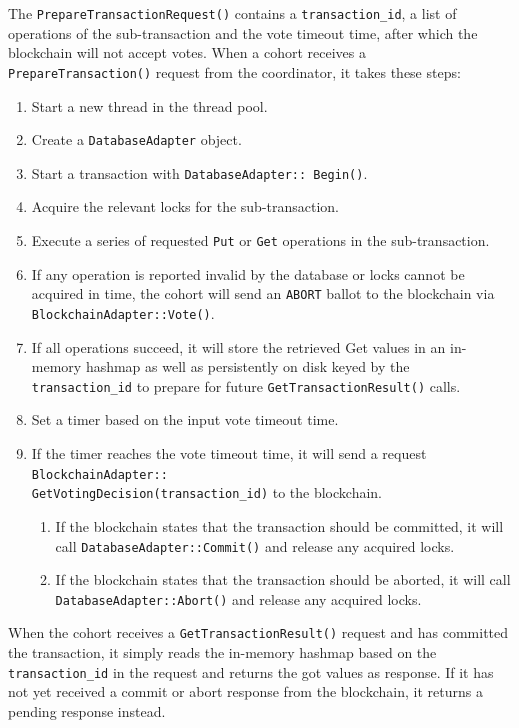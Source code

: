 \documentclass[11pt,conference]{IEEEtran}
\begin{document}
The \texttt{PrepareTransactionRequest()} contains a \texttt{transaction\_id}, a list of operations of the sub-transaction and the vote timeout time, after which the blockchain will not accept votes. When a cohort receives a \texttt{PrepareTransaction()} request from the coordinator, it takes these steps: 
\begin{enumerate}
  \item Start a new thread in the thread pool.
  \item Create a \texttt{DatabaseAdapter} object.
  \item Start a transaction with \texttt{DatabaseAdapter:: Begin()}.
  \item Acquire the relevant locks for the sub-transaction.
  \item Execute a series of requested \texttt{Put} or \texttt{Get} operations in the sub-transaction. 
  \item If any operation is reported invalid by the database or locks cannot be acquired in time, the cohort will send an \texttt{ABORT} ballot to the blockchain via \texttt{BlockchainAdapter::Vote()}.
  \item If all operations succeed, it will store the retrieved Get values in an in-memory hashmap as well as persistently on disk keyed by the \texttt{transaction\_id} to prepare for future \texttt{GetTransactionResult()} calls.
  \item Set a timer based on the input vote timeout time.
  \item If the timer reaches the vote timeout time, it will send a request \texttt{BlockchainAdapter::\\GetVotingDecision(transaction\_id)} to the blockchain. 
    \begin{enumerate}
      \item If the blockchain states that the transaction should be committed, it will call \texttt{DatabaseAdapter::Commit()} and release any acquired locks.
  \item If the blockchain states that the transaction should be aborted, it will call \texttt{DatabaseAdapter::Abort()} and release any acquired locks.
  \end{enumerate}
\end{enumerate}

When the cohort receives a \texttt{GetTransactionResult()} request and has committed the transaction, it simply reads the in-memory hashmap based on the \texttt{transaction\_id} in the request and returns the got values as response. If it has not yet received a commit or abort response from the blockchain, it returns a pending response instead.
\end{document}
